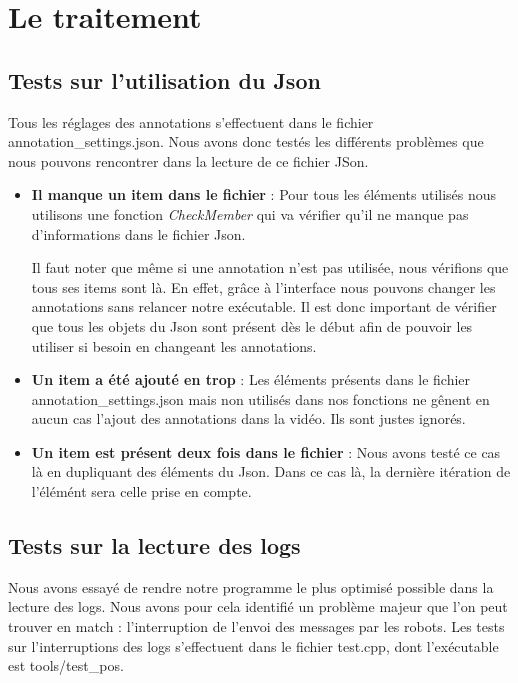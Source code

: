 \documentclass[a4paper,12pt]{report}
\begin{document}
\section{Le traitement}

\subsection{Tests sur l'utilisation du Json}

Tous les réglages des annotations s'effectuent dans le fichier annotation\_settings.json. Nous avons donc testés les différents problèmes que nous pouvons rencontrer dans la lecture de ce fichier JSon.
\\

\begin{itemize}
    \item \textbf{Il manque un item dans le fichier} : Pour tous les éléments utilisés nous utilisons une fonction \textit{CheckMember} qui va vérifier qu'il ne manque pas d'informations dans le fichier Json. 
    
    Il faut noter que même si une annotation n'est pas utilisée, nous vérifions que tous ses items sont là. En effet, grâce à l'interface nous pouvons changer les annotations sans relancer notre exécutable. Il est donc important de vérifier que tous les objets du Json sont présent dès le début afin de pouvoir les utiliser si besoin en changeant les annotations.
    \item \textbf{Un item a été ajouté en trop} : Les éléments présents dans le fichier annotation\_settings.json mais non utilisés dans nos fonctions ne gênent en aucun cas l'ajout des annotations dans la vidéo. Ils sont justes ignorés.
    \item \textbf{Un item est présent deux fois dans le fichier} : Nous avons testé ce cas là en dupliquant des éléments du Json. Dans ce cas là, la dernière itération de l'élémént sera celle prise en compte.
\end{itemize}

\subsection{Tests sur la lecture des logs}

Nous avons essayé de rendre notre programme le plus optimisé possible dans la lecture des logs. Nous avons pour cela identifié un problème majeur que l'on peut trouver en match : l'interruption de l'envoi des messages par les robots. Les tests sur l'interruptions des logs s'effectuent dans le fichier test.cpp, dont l'exécutable est tools/test\_pos.
\end{document}
